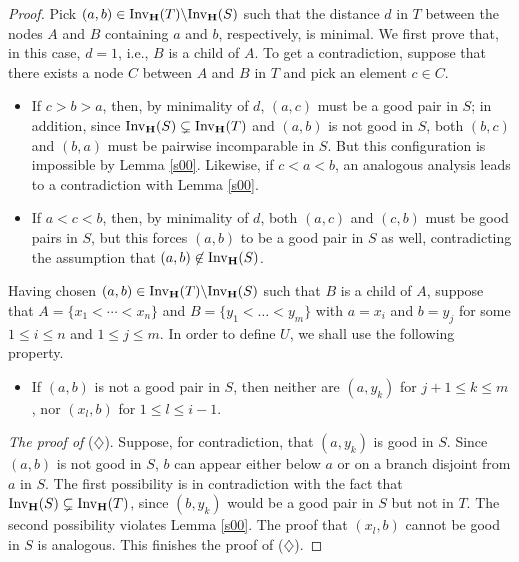 \documentclass{article}
\theoremstyle{plain}
\theoremstyle{definition}
\newcommand{\Inv}{{\mathrm{Inv}}}
\begin{document}
\begin{proof}
Pick $(a,b)\in \Inv_{\bf H}(T)\backslash \Inv_{\bf H}(S)$ such that the distance $d$ in $T$ between the nodes $A$ and $B$ containing $a$ and $b$, respectively, is minimal. We first prove that, in this case, $d=1$, i.e., $B$ is a child of $A$. To get a contradiction, suppose that there exists a node $C$ between $A$ and $B$ in $T$ and pick an element $c\in C$. 
\begin{itemize}
\item If $c>b>a$, then, by minimality of $d$, $(a,c)$ must be a good pair in $S$; in addition, since $\Inv_{\bf H}(S)\subsetneq \Inv_{\bf H}(T)$ and $(a,b)$ is not good in $S$, both $(b,c)$ and $(b,a)$ must be pairwise incomparable in $S$. But this configuration is impossible by Lemma \ref{s00}. Likewise, if $c<a<b$, an analogous analysis leads to a contradiction with Lemma \ref{s00}.
\item If $a<c<b$, then, by minimality of $d$, both $(a,c)$ and $(c,b)$ must be good pairs in $S$, but this forces $(a,b)$ to be a good pair in $S$ as well, contradicting the assumption that $(a,b)\not\in \Inv_{\bf H}(S)$.
\end{itemize}

 

Having chosen $(a,b)\in \Inv_{\bf H}(T)\backslash \Inv_{\bf H}(S)$ such that $B$ is a child of $A$, suppose that $A=\{x_1<\cdots <x_n\}$ and $B=\{y_1<\dots<y_m\}$ with $a=x_i$ and $b=y_j$ for some $1\leq i\leq n$ and $1\leq j\leq m$. In order to define $U$, we shall use the following property.
\begin{itemize}
\item[($\diamondsuit$)] If $(a,b)$ is not a good pair in $S$, then neither are $(a,y_k)$ for $j+1\leq k\leq m$, nor $(x_l,b)$ for $1\leq l\leq i-1$.
\end{itemize}

{\em The proof of } ($\diamondsuit$). Suppose, for contradiction, that $(a,y_k)$ is good in $S$. Since $(a,b)$ is not good in $S$, $b$ can appear either below $a$ or on a branch disjoint from $a$ in $S$. The first possibility is in contradiction with the fact that $\Inv_{\bf H}(S)\subsetneq \Inv_{\bf H}(T)$, since $(b,y_k)$ would be a good pair in $S$ but not in $T$. The second possibility violates Lemma \ref{s00}. The proof that $(x_l,b)$ cannot be good in $S$ is analogous. This finishes the proof of ($\diamondsuit$).

\medskip


\end{proof}
\end{document}
